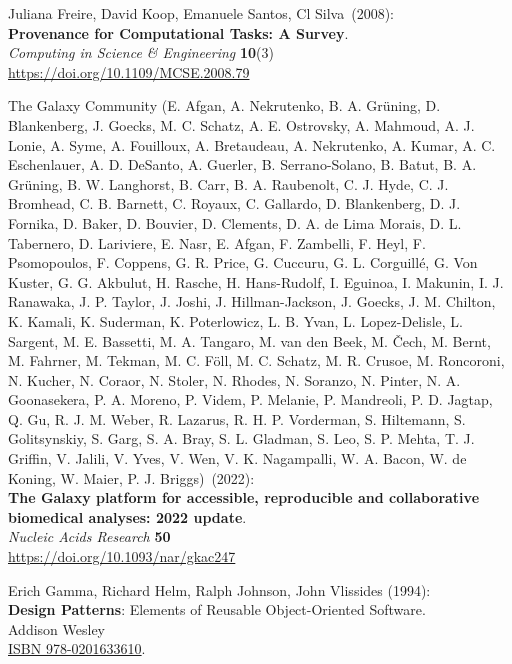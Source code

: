 \begin{thebibliography}{9}
Juliana Freire, David Koop, Emanuele Santos, Cl Silva~(2008): \\
\textbf{Provenance for Computational Tasks: A Survey}.\\
\emph{Computing in Science \& Engineering} \textbf{10}(3) \\
\url{https://doi.org/10.1109/MCSE.2008.79}

The Galaxy Community (E. Afgan, A. Nekrutenko, B. A.
Grüning, D. Blankenberg, J. Goecks, M. C. Schatz, A. E. Ostrovsky, A.
Mahmoud, A. J. Lonie, A. Syme, A. Fouilloux, A. Bretaudeau, A.
Nekrutenko, A. Kumar, A. C. Eschenlauer, A. D. DeSanto, A. Guerler, B.
Serrano-Solano, B. Batut, B. A. Grüning, B. W. Langhorst, B. Carr, B. A.
Raubenolt, C. J. Hyde, C. J. Bromhead, C. B. Barnett, C. Royaux, C.
Gallardo, D. Blankenberg, D. J. Fornika, D. Baker, D. Bouvier, D.
Clements, D. A. de Lima Morais, D. L. Tabernero, D. Lariviere, E. Nasr,
E. Afgan, F. Zambelli, F. Heyl, F. Psomopoulos, F. Coppens, G. R. Price,
G. Cuccuru, G. L. Corguillé, G. Von Kuster, G. G. Akbulut, H. Rasche, H.
Hans-Rudolf, I. Eguinoa, I. Makunin, I. J. Ranawaka, J. P. Taylor, J.
Joshi, J. Hillman-Jackson, J. Goecks, J. M. Chilton, K. Kamali, K.
Suderman, K. Poterlowicz, L. B. Yvan, L. Lopez-Delisle, L. Sargent, M.
E. Bassetti, M. A. Tangaro, M. van den Beek, M. Čech, M. Bernt, M.
Fahrner, M. Tekman, M. C. Föll, M. C. Schatz, M. R. Crusoe, M.
Roncoroni, N. Kucher, N. Coraor, N. Stoler, N. Rhodes, N. Soranzo, N.
Pinter, N. A. Goonasekera, P. A. Moreno, P. Videm, P. Melanie, P.
Mandreoli, P. D. Jagtap, Q. Gu, R. J. M. Weber, R. Lazarus, R. H. P.
Vorderman, S. Hiltemann, S. Golitsynskiy, S. Garg, S. A. Bray, S. L.
Gladman, S. Leo, S. P. Mehta, T. J. Griffin, V. Jalili, V. Yves, V. Wen,
V. K. Nagampalli, W. A. Bacon, W. de Koning, W. Maier, P. J. Briggs)~(2022): \\
\textbf{The Galaxy platform for accessible, reproducible and
collaborative biomedical analyses: 2022 update}.\\
\emph{Nucleic Acids Research} \textbf{50}\\
\url{https://doi.org/10.1093/nar/gkac247}

Erich Gamma, Richard Helm, Ralph Johnson, John Vlissides (1994):\\
\textbf{Design Patterns}: Elements of Reusable Object-Oriented Software. \\
Addison Wesley \\ 
\href{https://identifiers.org/isbn/9780201633610}{ISBN 978-0201633610}.


\end{thebibliography}
